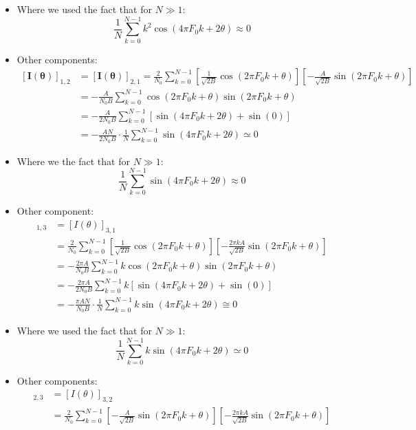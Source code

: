 \begin{itemize}
    \item Where we used the fact that for \(N\gg 1\):
    \[
    \frac{1}{N}\sum_{k=0}^{N-1}k^2\cos(4\pi F_0k+2\theta)\approx0
    \]
\item Other components:
\begin{align*}
\left[\mathbf{I}(\boldsymbol{\theta})\right]_{1,2}
&= \left[\mathbf{I}(\boldsymbol{\theta})\right]_{2,1}
= \frac{2}{N_0} \sum_{k=0}^{N-1} \left[
    \frac{1}{\sqrt{2B}} \cos(2\pi F_0 k + \theta)
\right] \left[
    -\frac{A}{\sqrt{2B}} \sin(2\pi F_0 k + \theta)
\right]\\
&= -\frac{A}{N_0 B} \sum_{k=0}^{N-1} \cos(2\pi F_0 k + \theta) \sin(2\pi F_0 k + \theta)\\
&= -\frac{A}{2N_0 B} \sum_{k=0}^{N-1} [\sin(4\pi F_0 k + 2\theta) + \sin(0)]\\
&= -\frac{A N}{2N_0 B} \cdot \frac{1}{N} \sum_{k=0}^{N-1} \sin(4\pi F_0 k + 2\theta) \simeq 0
\end{align*}
    \item Where we the fact that for \(N\gg 1\):
    \[
    \frac{1}{N}\sum_{k=0}^{N-1}\sin(4\pi F_0k+2\theta)\approx0
    \]
    \item Other component:
    \begin{align*}
[I(\theta)]_{1,3} &= [I(\theta)]_{3,1} \\
&= \frac{2}{N_0} \sum_{k=0}^{N-1}
   \left[ \frac{1}{\sqrt{2B}} \cos(2\pi F_0 k + \theta) \right]
   \left[ -\frac{2\pi k A}{\sqrt{2B}} \sin(2\pi F_0 k + \theta) \right] \\
&= -\frac{2\pi A}{N_0 B} \sum_{k=0}^{N-1}
   k \cos(2\pi F_0 k + \theta) \sin(2\pi F_0 k + \theta) \\
&= -\frac{2\pi A}{2 N_0 B} \sum_{k=0}^{N-1}
   k \left[ \sin(4\pi F_0 k + 2\theta) + \sin(0) \right] \\
&= -\frac{\pi A N}{N_0 B} \cdot \frac{1}{N} \sum_{k=0}^{N-1}
   k \sin(4\pi F_0 k + 2\theta) \cong 0
\end{align*}
    \item Where we used the fact that for \(N\gg1\):
    \[
    \frac{1}{N}\sum_{k=0}^{N-1}k\sin(4\pi F_0k+2\theta)\simeq0
    \]
    \item Other components:
    \begin{align*}
[I(\theta)]_{2,3} &= [I(\theta)]_{3,2} \\
&= \frac{2}{N_0} \sum_{k=0}^{N-1}
   \left[ -\frac{A}{\sqrt{2B}} \sin(2\pi F_0 k + \theta) \right]
   \left[ -\frac{2\pi k A}{\sqrt{2B}} \sin(2\pi F_0 k + \theta) \right] \\

\end{align*}
\end{itemize}
